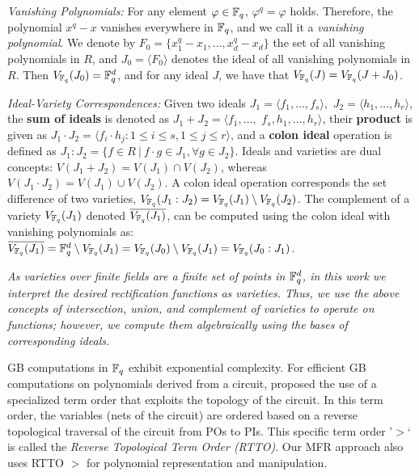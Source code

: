 {\it Vanishing Polynomials:} For any element $\varphi\in{\mathbb{F}}_{q}$, $\varphi^q=\varphi$ holds. Therefore,
the polynomial $x^q-x$ vanishes everywhere in ${\mathbb{F}}_{q}$, and we call it a
{\it vanishing polynomial}. We denote by $F_0 =
\{x_1^q-x_1,\dots,x_d^q-x_d\}$ the set of all vanishing polynomials in
$R$, and  $J_0 = \langle F_0 \rangle$ denotes the ideal of all
vanishing polynomials in $R$. Then $V_{{\mathbb{F}}_{q}}(J_0) = {\mathbb{F}}_{q}^d$, and for any
ideal $J$, we have that $V_{{\mathbb{F}}_{q}}(J)=V_{{\mathbb{F}}_{q}}(J+J_0)$.

{\it Ideal-Variety Correspondences:} Given two ideals $J_1 = \langle
f_1,\dots,f_s\rangle,$ $J_2=\langle h_1,\dots,h_r\rangle$, the {\bf
  sum of ideals} is denoted as $J_1 + J_2 = \langle
f_1,\dots,$ $f_s,h_1,\dots,h_r\rangle$, their {\bf product} is
given as $J_1\cdot J_2 = \langle f_i\cdot h_j: 1\leq i\leq s, 1\leq
j\leq r\rangle$, and a {\bf colon ideal} operation is defined as
$J_1:J_2 = \{f \in R\ |\ f\cdot g \in J_1, \forall g \in J_2\}$. 
Ideals and varieties are dual concepts:
$V(J_1 + J_2) = V(J_1) \cap V(J_2)$, whereas $V(J_1\cdot J_2) = V(J_1)
\cup V(J_2)$. A colon ideal operation corresponds the set difference of 
two varieties, $V_{{\mathbb{F}}_{q}}(J_1:J_2)=V_{{\mathbb{F}}_{q}}(J_1)
\setminus V_{{\mathbb{F}}_{q}}(J_2)$. 
The complement of a variety $V_{{\mathbb{F}}_{q}}(J_1)$ denoted $\overline{V_{{\mathbb{F}}_{q}}(J_1)}$, 
can be computed using the colon ideal with vanishing polynomials 
as: $\overline{V_{{\mathbb{F}}_{q}}(J_1)} = {\mathbb{F}}_{q}^d \setminus
V_{{\mathbb{F}}_{q}}(J_1) = V_{{\mathbb{F}}_{q}}(J_0) \setminus V_{{\mathbb{F}}_{q}}(J_1) = V_{{\mathbb{F}}_{q}}(J_0:J_1)$.

{\it As varieties over finite fields are a finite set of points in ${\mathbb{F}}_{q}^d$,
in this work we interpret the desired rectification functions as
varieties. Thus, we use the above concepts of intersection, union, and
complement of varieties to operate on functions; however, we compute
them algebraically using the \Grobner bases of corresponding ideals.}

GB computations in ${\mathbb{F}}_q$ exhibit exponential complexity. For
efficient GB computations on polynomials derived from a circuit,
\cite{lv:tcad2013} proposed the use of a specialized term order that
exploits the topology of the circuit. 
In this term order, the variables (nets of the circuit) are ordered
based on a reverse topological traversal of the circuit from POs to
PIs. This specific term order '$>$` is called the {\it Reverse
  Topological Term Order (RTTO)}. Our MFR approach also uses RTTO $>$
for polynomial representation and manipulation. 


